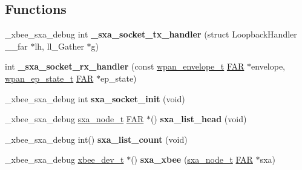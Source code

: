 \subsection*{Functions}
\begin{DoxyCompactItemize}
\item 
\mbox{\label{group___s_x_a_ga04cec5760ca52362801366f825805a0f}} 
\+\_\+xbee\+\_\+sxa\+\_\+debug int {\bfseries \+\_\+sxa\+\_\+socket\+\_\+tx\+\_\+handler} (struct Loopback\+Handler \+\_\+\+\_\+far $\ast$lh, ll\+\_\+\+Gather $\ast$g)
\item 
\mbox{\label{group___s_x_a_gad08c29c9cffd4775a178909a52d93121}} 
int {\bfseries \+\_\+sxa\+\_\+socket\+\_\+rx\+\_\+handler} (const \hyperlink{structwpan__envelope__t}{wpan\+\_\+envelope\+\_\+t} \hyperlink{group__hal_gaef060b3456fdcc093a7210a762d5f2ed}{F\+AR} $\ast$envelope, \hyperlink{structwpan__ep__state__t}{wpan\+\_\+ep\+\_\+state\+\_\+t} \hyperlink{group__hal_gaef060b3456fdcc093a7210a762d5f2ed}{F\+AR} $\ast$ep\+\_\+state)
\item 
\mbox{\label{group___s_x_a_gaacbb5ad05beda82f9f21740433c7d3f9}} 
\+\_\+xbee\+\_\+sxa\+\_\+debug int {\bfseries sxa\+\_\+socket\+\_\+init} (void)
\item 
\mbox{\label{group___s_x_a_gad0139281f543c65392ad240887314fec}} 
\+\_\+xbee\+\_\+sxa\+\_\+debug \hyperlink{structsxa__node__t}{sxa\+\_\+node\+\_\+t} \hyperlink{group__hal_gaef060b3456fdcc093a7210a762d5f2ed}{F\+AR} $\ast$() {\bfseries sxa\+\_\+list\+\_\+head} (void)
\item 
\mbox{\label{group___s_x_a_gac6f2b023adc97cc6329c8879ed129520}} 
\+\_\+xbee\+\_\+sxa\+\_\+debug int() {\bfseries sxa\+\_\+list\+\_\+count} (void)
\item 
\mbox{\label{group___s_x_a_gafcff798c9cdd29339bd32d72fec3ec52}} 
\+\_\+xbee\+\_\+sxa\+\_\+debug \hyperlink{structxbee__dev__t}{xbee\+\_\+dev\+\_\+t} $\ast$() {\bfseries sxa\+\_\+xbee} (\hyperlink{structsxa__node__t}{sxa\+\_\+node\+\_\+t} \hyperlink{group__hal_gaef060b3456fdcc093a7210a762d5f2ed}{F\+AR} $\ast$sxa)
\item 
\mbox{\label{group___s_x_a_gac3fa6c3eac7807ed51bdbee114e9e4dc}} 

\end{DoxyCompactItemize}

